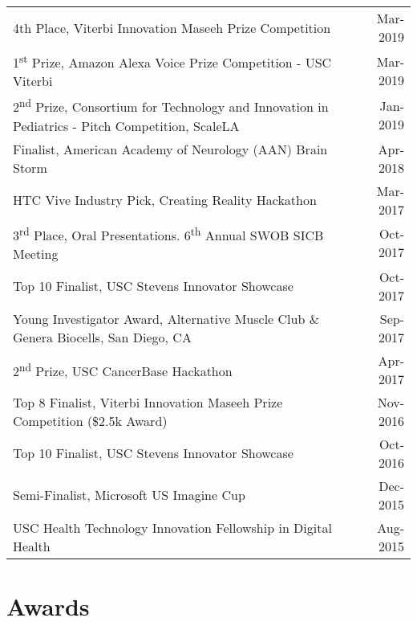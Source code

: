 \documentclass[10pt,a4paper]{article}
\newcommand{\ts}{\textsuperscript}
\begin{document}
  \vspace*{1mm}\noindent\begin{tabularx}{17cm}{X r}
    4th Place, Viterbi Innovation Maseeh Prize Competition & Mar-2019 \\ %
    1\ts{st} Prize, Amazon Alexa Voice Prize Competition - USC Viterbi & Mar-2019 \\ %
    2\ts{nd} Prize, Consortium for Technology and Innovation in Pediatrics - Pitch Competition, ScaleLA & Jan-2019\\ 
    Finalist, American Academy of Neurology (AAN) Brain Storm & Apr-2018 \\%
    HTC Vive Industry Pick, Creating Reality Hackathon & Mar-2017 \\%
    3\ts{rd} Place, Oral Presentations. 6\ts{th} Annual SWOB SICB Meeting & Oct-2017\\ %
    Top 10 Finalist, USC Stevens Innovator Showcase & Oct-2017 \\%
    Young Investigator Award, Alternative Muscle Club \& Genera Biocells, San Diego, CA & Sep-2017\\ %
    2\ts{nd} Prize, USC CancerBase Hackathon & Apr-2017 \\ %
    Top 8 Finalist, Viterbi Innovation Maseeh Prize Competition (\$2.5k Award) & Nov-2016 \\ %
    Top 10 Finalist, USC Stevens Innovator Showcase & Oct-2016 \\ %
    Semi-Finalist, Microsoft US Imagine Cup & Dec-2015 \\
    USC Health Technology Innovation Fellowship in Digital Health & Aug-2015\\

  \end{tabularx}

\vspace*{2mm}\section*{Awards}
  
\end{document}
